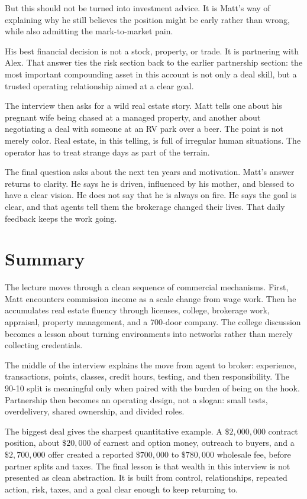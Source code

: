 But this should not be turned into investment advice. It is Matt's way of explaining why he still believes the position might be early rather than wrong, while also admitting the mark-to-market pain.

His best financial decision is not a stock, property, or trade. It is partnering with Alex. That answer ties the risk section back to the earlier partnership section: the most important compounding asset in this account is not only a deal skill, but a trusted operating relationship aimed at a clear goal.

The interview then asks for a wild real estate story. Matt tells one about his pregnant wife being chased at a managed property, and another about negotiating a deal with someone at an RV park over a beer. The point is not merely color. Real estate, in this telling, is full of irregular human situations. The operator has to treat strange days as part of the terrain.

The final question asks about the next ten years and motivation. Matt's answer returns to clarity. He says he is driven, influenced by his mother, and blessed to have a clear vision. He does not say that he is always on fire. He says the goal is clear, and that agents tell them the brokerage changed their lives. That daily feedback keeps the work going.

\section{Summary}

The lecture moves through a clean sequence of commercial mechanisms. First, Matt encounters commission income as a scale change from wage work. Then he accumulates real estate fluency through licenses, college, brokerage work, appraisal, property management, and a 700-door company. The college discussion becomes a lesson about turning environments into networks rather than merely collecting credentials.

The middle of the interview explains the move from agent to broker: experience, transactions, points, classes, credit hours, testing, and then responsibility. The 90-10 split is meaningful only when paired with the burden of being on the hook. Partnership then becomes an operating design, not a slogan: small tests, overdelivery, shared ownership, and divided roles.

The biggest deal gives the sharpest quantitative example. A \(\$2{,}000{,}000\) contract position, about \(\$20{,}000\) of earnest and option money, outreach to buyers, and a \(\$2{,}700{,}000\) offer created a reported \(\$700{,}000\) to \(\$780{,}000\) wholesale fee, before partner splits and taxes. The final lesson is that wealth in this interview is not presented as clean abstraction. It is built from control, relationships, repeated action, risk, taxes, and a goal clear enough to keep returning to.